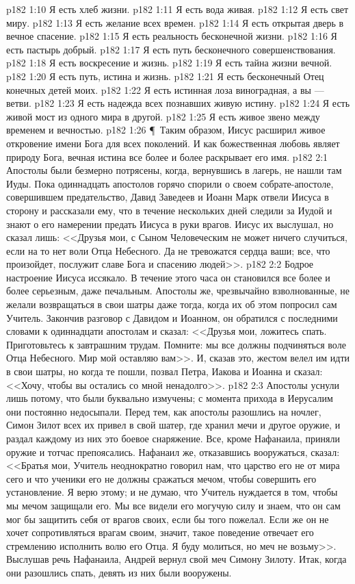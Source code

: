 \vs p182 1:10 Я есть хлеб жизни.
\vs p182 1:11 Я есть вода живая.
\vs p182 1:12 Я есть свет миру.
\vs p182 1:13 Я есть желание всех времен.
\vs p182 1:14 Я есть открытая дверь в вечное спасение.
\vs p182 1:15 Я есть реальность бесконечной жизни.
\vs p182 1:16 Я есть пастырь добрый.
\vs p182 1:17 Я есть путь бесконечного совершенствования.
\vs p182 1:18 Я есть воскресение и жизнь.
\vs p182 1:19 Я есть тайна жизни вечной.
\vs p182 1:20 Я есть путь, истина и жизнь.
\vs p182 1:21 Я есть бесконечный Отец конечных детей моих.
\vs p182 1:22 Я есть истинная лоза виноградная, а вы --- ветви.
\vs p182 1:23 Я есть надежда всех познавших живую истину.
\vs p182 1:24 Я есть живой мост из одного мира в другой.
\vs p182 1:25 Я есть живое звено между временем и вечностью.
\vs p182 1:26 \P\ Таким образом, Иисус расширил живое откровение имени Бога для всех поколений. И как божественная любовь являет природу Бога, вечная истина все более и более раскрывает его имя.
\vs p182 2:1 Апостолы были безмерно потрясены, когда, вернувшись в лагерь, не нашли там Иуды. Пока одиннадцать апостолов горячо спорили о своем собрате\hyp{}апостоле, совершившем предательство, Давид Заведеев и Иоанн Марк отвели Иисуса в сторону и рассказали ему, что в течение нескольких дней следили за Иудой и знают о его намерении предать Иисуса в руки врагов. Иисус их выслушал, но сказал лишь: <<Друзья мои, с Сыном Человеческим не может ничего случиться, если на то нет воли Отца Небесного. Да не тревожатся сердца ваши; все, что произойдет, послужит славе Бога и спасению людей>>.
\vs p182 2:2 Бодрое настроение Иисуса иссякало. В течение этого часа он становился все более и более серьезным, даже печальным. Апостолы же, чрезвычайно взволнованные, не желали возвращаться в свои шатры даже тогда, когда их об этом попросил сам Учитель. Закончив разговор с Давидом и Иоанном, он обратился с последними словами к одиннадцати апостолам и сказал: <<Друзья мои, ложитесь спать. Приготовьтесь к завтрашним трудам. Помните: мы все должны подчиняться воле Отца Небесного. Мир мой оставляю вам>>. И, сказав это, жестом велел им идти в свои шатры, но когда те пошли, позвал Петра, Иакова и Иоанна и сказал: <<Хочу, чтобы вы остались со мной ненадолго>>.
\vs p182 2:3 Апостолы уснули лишь потому, что были буквально измучены; с момента прихода в Иерусалим они постоянно недосыпали. Перед тем, как апостолы разошлись на ночлег, Симон Зилот всех их привел в свой шатер, где хранил мечи и другое оружие, и раздал каждому из них это боевое снаряжение. Все, кроме Нафанаила, приняли оружие и тотчас препоясались. Нафанаил же, отказавшись вооружаться, сказал: <<Братья мои, Учитель неоднократно говорил нам, что царство его не от мира сего и что ученики его не должны сражаться мечом, чтобы совершить его установление. Я верю этому; и не думаю, что Учитель нуждается в том, чтобы мы мечом защищали его. Мы все видели его могучую силу и знаем, что он сам мог бы защитить себя от врагов своих, если бы того пожелал. Если же он не хочет сопротивляться врагам своим, значит, такое поведение отвечает его стремлению исполнить волю его Отца. Я буду молиться, но меч не возьму>>. Выслушав речь Нафанаила, Андрей вернул свой меч Симону Зилоту. Итак, когда они разошлись спать, девять из них были вооружены.
